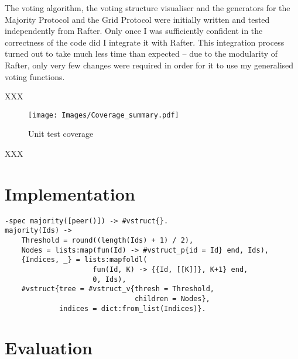 \documentclass[11pt,chapterprefix=true,toc=bibliography,numbers=noendperiod,
               footnotes=multiple,twoside]{scrreprt}
\begin{document}
The voting algorithm, the voting structure visualiser and the generators for the Majority Protocol and the Grid Protocol were initially written and tested independently from Rafter. Only once I was sufficiently confident in the correctness of the code did I integrate it with Rafter. This integration process turned out to take much less time than expected -- due to the modularity of Rafter, only very few changes were required in order for it to use my generalised voting functions.


XXX

\begin{figure}[h]
    \centering
    \texttt{[image: Images/Coverage\_summary.pdf]}
    \caption{Unit test coverage}
    \label{fig:coverage}
\end{figure}

XXX

\chapter{Implementation\label{ch:implementation}}


\begin{lstlisting}[style=erlang, caption={Majority Protocol voting structure generator code}, label=lst:majority, float=htpb]
-spec majority([peer()]) -> #vstruct{}.
majority(Ids) ->
    Threshold = round((length(Ids) + 1) / 2),
    Nodes = lists:map(fun(Id) -> #vstruct_p{id = Id} end, Ids),
    {Indices, _} = lists:mapfoldl(
                     fun(Id, K) -> {{Id, [[K]]}, K+1} end,
                     0, Ids),
    #vstruct{tree = #vstruct_v{thresh = Threshold,
                               children = Nodes},
             indices = dict:from_list(Indices)}.
\end{lstlisting}

\chapter{Evaluation\label{ch:evaluation}}
\end{document}
